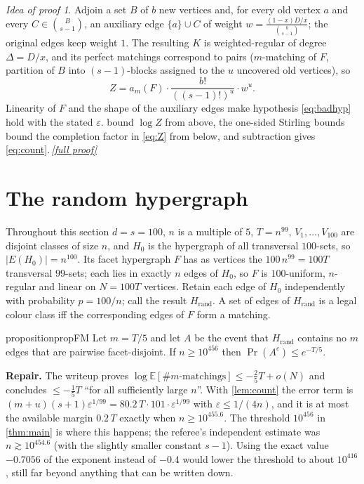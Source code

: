 \documentclass[11pt,a4paper]{article}
\theoremstyle{plain}
\theoremstyle{definition}
\theoremstyle{remark}
\newtheorem*{proofidea}{Idea of proof}
\newcommand{\fullproofref}[1]{\,\hyperref[#1]{\textit{[full proof]}}}
\newcommand{\E}{\mathbb E}
\newcommand{\Hrand}{H_{\mathrm{rand}}}
\newcommand{\repair}[1]{\begin{tcolorbox}[colback=blue!4,colframe=blue!40!black,boxrule=0.4pt,arc=2pt,left=4pt,right=4pt,top=2pt,bottom=2pt]\small\textbf{Repair.} #1\end{tcolorbox}}
\begin{document}
\begin{proofidea}
Adjoin a set $B$ of $b$ new vertices and, for every old vertex $a$ and every $C\in\binom{B}{s-1}$, an auxiliary edge $\{a\}\cup C$ of weight $w=\frac{(1-x)D/x}{\binom{b}{s-1}}$; the original edges keep weight $1$. The resulting $K$ is weighted-regular of degree $\Delta=D/x$, and its perfect matchings correspond to pairs ($m$-matching of $F$, partition of $B$ into $(s-1)$-blocks assigned to the $u$ uncovered old vertices), so
\begin{equation}\label{eq:Z}
Z=a_m(F)\cdot\frac{b!}{((s-1)!)^u}\cdot w^u .
\end{equation}
Linearity of $F$ and the shape of the auxiliary edges make hypothesis \eqref{eq:badhyp} hold with the stated $\varepsilon$.  bound $\log Z$ from above, the one-sided Stirling bounds bound the completion factor in \eqref{eq:Z} from below, and subtraction gives \eqref{eq:count}.\fullproofref{pf:count}
\end{proofidea}

\section{The random hypergraph}\label{sec:random}

Throughout this section $d=s=100$, $n$ is a multiple of $5$, $T=n^{99}$, $V_1,\dots,V_{100}$ are disjoint classes of size $n$, and $H_0$ is the hypergraph of all transversal $100$-sets, so $|E(H_0)|=n^{100}$. Its facet hypergraph $F$ has as vertices the $100\,n^{99}=100T$ transversal $99$-sets; each lies in exactly $n$ edges of $H_0$, so $F$ is $100$-uniform, $n$-regular and linear on $N=100T$ vertices. Retain each edge of $H_0$ independently with probability $p=100/n$; call the result $\Hrand$. A set of edges of $\Hrand$ is a legal colour class iff the corresponding edges of $F$ form a matching.

\begin{restatable}{proposition}{propFM}\label{prop:firstmoment}
Let $m=T/5$ and let $A$ be the event that $\Hrand$ contains no $m$ edges that are pairwise facet-disjoint. If $n\ge10^{456}$ then $\Pr(A^{c})\le e^{-T/5}$.
\end{restatable}

\repair{The writeup proves $\log\E[\#\text{$m$-matchings}]\le-\tfrac25T+o(N)$ and concludes $\le-\tfrac15T$ ``for all sufficiently large $n$''. With \cref{lem:count} the error term is $(m+u)(s+1)\varepsilon^{1/99}=80.2\,T\cdot101\cdot\varepsilon^{1/99}$ with $\varepsilon\le1/(4n)$, and it is at most the available margin $0.2\,T$ exactly when $n\ge10^{455.6}$. The threshold $10^{456}$ in \cref{thm:main} is where this happens; the referee's independent estimate was $n\gtrsim10^{454.6}$ (with the slightly smaller constant $s-1$). Using the exact value $-0.7056$ of the exponent instead of $-0.4$ would lower the threshold to about $10^{416}$, still far beyond anything that can be written down.}
\end{document}
